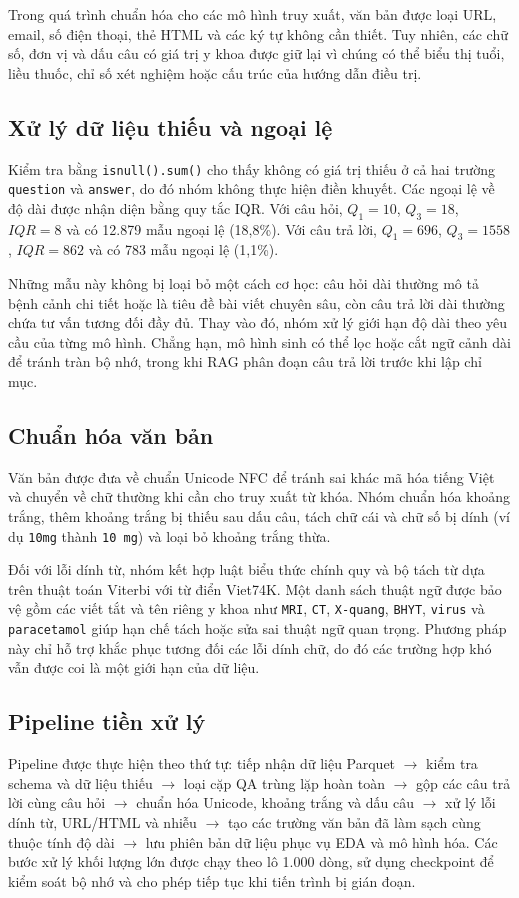 \documentclass[12pt,a4paper,oneside]{report}
\begin{document}
Trong quá trình chuẩn hóa cho các mô hình truy xuất, văn bản được loại URL, email, số điện thoại, thẻ HTML và các ký tự không cần thiết. Tuy nhiên, các chữ số, đơn vị và dấu câu có giá trị y khoa được giữ lại vì chúng có thể biểu thị tuổi, liều thuốc, chỉ số xét nghiệm hoặc cấu trúc của hướng dẫn điều trị.

\subsection{Xử lý dữ liệu thiếu và ngoại lệ}
Kiểm tra bằng \texttt{isnull().sum()} cho thấy không có giá trị thiếu ở cả hai trường \texttt{question} và \texttt{answer}, do đó nhóm không thực hiện điền khuyết. Các ngoại lệ về độ dài được nhận diện bằng quy tắc IQR. Với câu hỏi, $Q_1=10$, $Q_3=18$, $IQR=8$ và có 12.879 mẫu ngoại lệ (18,8\%). Với câu trả lời, $Q_1=696$, $Q_3=1558$, $IQR=862$ và có 783 mẫu ngoại lệ (1,1\%).

Những mẫu này không bị loại bỏ một cách cơ học: câu hỏi dài thường mô tả bệnh cảnh chi tiết hoặc là tiêu đề bài viết chuyên sâu, còn câu trả lời dài thường chứa tư vấn tương đối đầy đủ. Thay vào đó, nhóm xử lý giới hạn độ dài theo yêu cầu của từng mô hình. Chẳng hạn, mô hình sinh có thể lọc hoặc cắt ngữ cảnh dài để tránh tràn bộ nhớ, trong khi RAG phân đoạn câu trả lời trước khi lập chỉ mục.

\subsection{Chuẩn hóa văn bản}
Văn bản được đưa về chuẩn Unicode NFC để tránh sai khác mã hóa tiếng Việt và chuyển về chữ thường khi cần cho truy xuất từ khóa. Nhóm chuẩn hóa khoảng trắng, thêm khoảng trắng bị thiếu sau dấu câu, tách chữ cái và chữ số bị dính (ví dụ \texttt{10mg} thành \texttt{10 mg}) và loại bỏ khoảng trắng thừa.

Đối với lỗi dính từ, nhóm kết hợp luật biểu thức chính quy và bộ tách từ dựa trên thuật toán Viterbi với từ điển Viet74K. Một danh sách thuật ngữ được bảo vệ gồm các viết tắt và tên riêng y khoa như \texttt{MRI}, \texttt{CT}, \texttt{X-quang}, \texttt{BHYT}, \texttt{virus} và \texttt{paracetamol} giúp hạn chế tách hoặc sửa sai thuật ngữ quan trọng. Phương pháp này chỉ hỗ trợ khắc phục tương đối các lỗi dính chữ, do đó các trường hợp khó vẫn được coi là một giới hạn của dữ liệu.

\subsection{Pipeline tiền xử lý}
Pipeline được thực hiện theo thứ tự: tiếp nhận dữ liệu Parquet $\rightarrow$ kiểm tra schema và dữ liệu thiếu $\rightarrow$ loại cặp QA trùng lặp hoàn toàn $\rightarrow$ gộp các câu trả lời cùng câu hỏi $\rightarrow$ chuẩn hóa Unicode, khoảng trắng và dấu câu $\rightarrow$ xử lý lỗi dính từ, URL/HTML và nhiễu $\rightarrow$ tạo các trường văn bản đã làm sạch cùng thuộc tính độ dài $\rightarrow$ lưu phiên bản dữ liệu phục vụ EDA và mô hình hóa. Các bước xử lý khối lượng lớn được chạy theo lô 1.000 dòng, sử dụng checkpoint để kiểm soát bộ nhớ và cho phép tiếp tục khi tiến trình bị gián đoạn.
\end{document}
